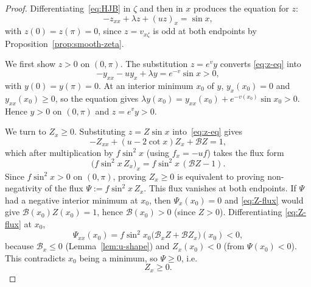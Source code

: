 \documentclass{amsart}
\begin{document}
\begin{proof}
Differentiating~\eqref{eq:HJB} in $\zeta$ and then in $x$ produces the
equation for $z$:
\begin{equation}\label{eq:z-eq}
-z_{xx}+\lambda z+(uz)_x=\sin x,
\end{equation}
with $z(0)=z(\pi)=0$, since $z=v_{x\zeta}$ is odd at both endpoints
by Proposition~\ref{prop:smooth-zeta}.

We first show $z>0$ on $(0,\pi)$. The substitution $z=e^v y$ converts
\eqref{eq:z-eq} into
\[
-y_{xx}-uy_x+\lambda y=e^{-v}\sin x>0 ,
\]
with $y(0)=y(\pi)=0$. At an interior minimum $x_0$ of $y$,
$y_x(x_0)=0$ and $y_{xx}(x_0)\geq 0$, so the equation gives
$\lambda y(x_0)=y_{xx}(x_0)+e^{-v(x_0)}\sin x_0>0$. Hence $y>0$ on
$(0,\pi)$ and $z=e^v y>0$.

We turn to $Z_x\geq 0$. Substituting $z=Z\sin x$
into~\eqref{eq:z-eq} gives
\begin{equation}\label{eq:Z-eq}
-Z_{xx}+(u-2\cot x)Z_x+\mathcal B Z=1,
\end{equation}
which after multiplication by $f\sin^2x$ (using $f_x=-uf$) takes the flux
form
\begin{equation}\label{eq:Z-flux}
\bigl(f\sin^2x\,Z_x\bigr)_x = f\sin^2x\,(\mathcal B Z-1).
\end{equation}
Since $f\sin^2x>0$ on $(0,\pi)$, proving $Z_x\geq0$ is equivalent to
proving non-negativity of the flux $\Psi:=f\sin^2x\,Z_x$. This flux
vanishes at both endpoints. If $\Psi$ had a negative interior minimum at
$x_0$, then $\Psi_x(x_0)=0$ and
\eqref{eq:Z-flux} would give $\mathcal B(x_0)Z(x_0)=1$, hence
$\mathcal B(x_0)>0$ (since $Z>0$). Differentiating \eqref{eq:Z-flux} at
$x_0$,
\[
\Psi_{xx}(x_0)=f\sin^2x_0\bigl(\mathcal B_xZ+\mathcal B Z_x\bigr)(x_0)<0,
\]
because $\mathcal B_x\leq 0$ (Lemma~\ref{lem:u-shape}) and
$Z_x(x_0)<0$ (from $\Psi(x_0)<0$). This contradicts $x_0$ being a
minimum, so $\Psi\geq 0$, i.e.\
\begin{equation}\label{eq:Z-mono}
Z_x\geq 0.
\end{equation}


\end{proof}
\end{document}
